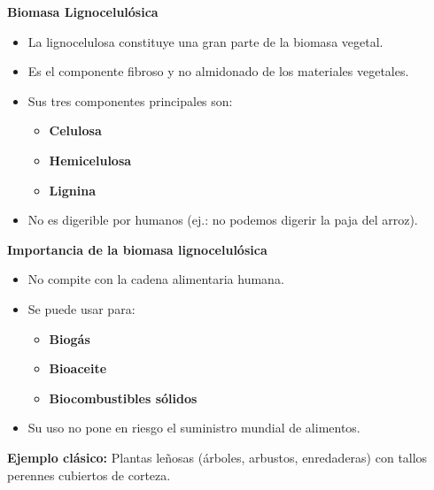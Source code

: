 \documentclass[../../main.tex]{subfiles}
\begin{document}
\begin{frame}{\textbf{Biomasa Lignocelulósica}}
\begin{itemize}
  \item La lignocelulosa constituye una gran parte de la biomasa vegetal.
  \item Es el componente fibroso y no almidonado de los materiales vegetales.
  \item Sus tres componentes principales son:
  \begin{itemize}
    \item \textbf{Celulosa}
    \item \textbf{Hemicelulosa}
    \item \textbf{Lignina}
  \end{itemize}
  \item No es digerible por humanos (ej.: no podemos digerir la paja del arroz).
\end{itemize}
\end{frame}

\begin{frame}{\textbf{Importancia de la biomasa lignocelulósica}}
\begin{itemize}
  \item No compite con la cadena alimentaria humana.
  \item Se puede usar para:
  \begin{itemize}
    \item \textbf{Biogás}
    \item \textbf{Bioaceite}
    \item \textbf{Biocombustibles sólidos}
  \end{itemize}
  \item Su uso no pone en riesgo el suministro mundial de alimentos.
\end{itemize}

\vspace{0.5em}
\textbf{Ejemplo clásico:}  
Plantas leñosas (árboles, arbustos, enredaderas) con tallos perennes cubiertos de corteza.
\end{frame}
\end{document}
